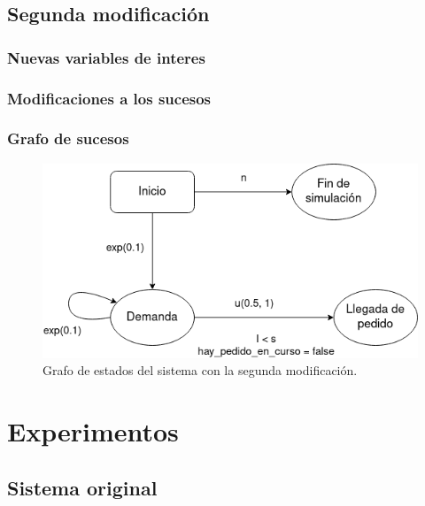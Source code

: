 \documentclass[12pt, spanish]{article}
\begin{document}
\subsection{Segunda modificación}

\subsubsection{Nuevas variables de interes}

\subsubsection{Modificaciones a los sucesos}

\subsubsection{Grafo de sucesos}

\begin{figure}[H]
  \centering
   \includegraphics[width=\textwidth]{grafo_sucesos_mod2.png}
	\caption{Grafo de estados del sistema con la segunda modificación.}
\end{figure}




\section{Experimentos}


\subsection{Sistema original}
\end{document}
